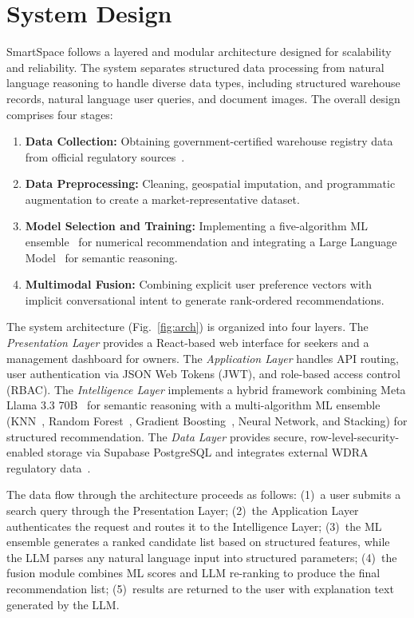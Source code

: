 \documentclass[pdflatex,sn-mathphys-num]{sn-jnl}
\theoremstyle{thmstyleone}
\theoremstyle{thmstyletwo}
\theoremstyle{thmstylethree}
\begin{document}

\section{System Design}\label{sec3}

SmartSpace follows a layered and modular architecture designed for scalability and reliability. The system separates structured data processing from natural language reasoning to handle diverse data types, including structured warehouse records, natural language user queries, and document images. The overall design comprises four stages:

\begin{enumerate}
    \item \textbf{Data Collection:} Obtaining government-certified warehouse registry data from official regulatory sources~\cite{b14}.
    \item \textbf{Data Preprocessing:} Cleaning, geospatial imputation, and programmatic augmentation to create a market-representative dataset.
    \item \textbf{Model Selection and Training:} Implementing a five-algorithm ML ensemble~\cite{b6, b11, b12} for numerical recommendation and integrating a Large Language Model~\cite{b13} for semantic reasoning.
    \item \textbf{Multimodal Fusion:} Combining explicit user preference vectors with implicit conversational intent to generate rank-ordered recommendations.
\end{enumerate}

The system architecture (Fig.~\ref{fig:arch}) is organized into four layers. The \textit{Presentation Layer} provides a React-based web interface for seekers and a management dashboard for owners. The \textit{Application Layer} handles API routing, user authentication via JSON Web Tokens (JWT), and role-based access control (RBAC). The \textit{Intelligence Layer} implements a hybrid framework combining Meta Llama 3.3 70B~\cite{b13} for semantic reasoning with a multi-algorithm ML ensemble (KNN~\cite{b11}, Random Forest~\cite{b6}, Gradient Boosting~\cite{b12}, Neural Network, and Stacking) for structured recommendation. The \textit{Data Layer} provides secure, row-level-security-enabled storage via Supabase PostgreSQL and integrates external WDRA regulatory data~\cite{b14}.

The data flow through the architecture proceeds as follows: (1)~a user submits a search query through the Presentation Layer; (2)~the Application Layer authenticates the request and routes it to the Intelligence Layer; (3)~the ML ensemble generates a ranked candidate list based on structured features, while the LLM parses any natural language input into structured parameters; (4)~the fusion module combines ML scores and LLM re-ranking to produce the final recommendation list; (5)~results are returned to the user with explanation text generated by the LLM.
\end{document}
